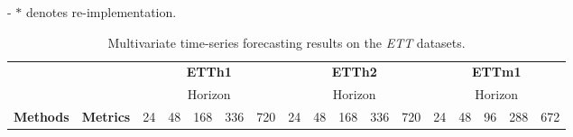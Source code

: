\documentclass{article}
\begin{document}
\begin{table*}[h]
{\begin{tabular}{ccllllllllllllll|l}
\end{tabular}
}
\begin{tablenotes} \tiny
		\item - $*$ denotes re-implementation.
 \end{tablenotes} \label{tab:longterm}
\end{table*}


\begin{table*}[htbp]	
\caption{Multivariate time-series forecasting results on the \emph{ETT} datasets.}
\begin{threeparttable}
  \resizebox{\textwidth}{!}
{
\begin{tabular}{c|c|c|c|c|c|c|c|c|c|c|c|c|c|c|c|c}
\hline
                                   &                                    & \multicolumn{5}{c|}{\textbf{ETTh1}}                                                                                                                      & \multicolumn{5}{c|}{\textbf{ETTh2}}                                                                                                                      & \multicolumn{5}{c}{\textbf{ETTm1}}                                                                                                                      \\ \cline{3-17} 
                                   &                                    & \multicolumn{5}{c|}{Horizon}                                                                                                                             & \multicolumn{5}{c|}{Horizon}                                                                                                                             & \multicolumn{5}{c}{Horizon}                                                                                                                             \\ \cline{3-17} 
\multirow{-3}{*}{\textbf{Methods}} & \multirow{-3}{*}{\textbf{Metrics}} & 24                           & 48                           & 168                          & 336                          & 720                          & 24                           & 48                           & 168                          & 336                          & 720                          & 24                           & 48                           & 96                           & 288                          & 672                          \\ \hline

\end{tabular}}
\end{threeparttable}
\end{table*}
\end{document}
